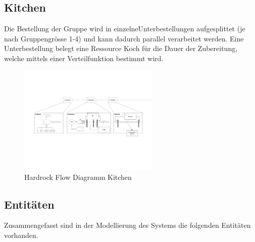 \documentclass[ngerman,a4paper,12pt]{scrreprt}
\begin{document}
\begin{landscape}
		\subsection{Kitchen}
		Die Bestellung der Gruppe wird in einzelneUnterbestellungen aufgesplittet (je nach Gruppengrösse 1-4) und kann dadurch parallel verarbeitet werden. Eine Unterbestellung belegt eine Ressource Koch für die Dauer der Zubereitung, welche mittels einer Verteilfunktion bestimmt wird.
		
		\begin{figure}[H]
			\begin{center}
					\includegraphics[page=3,trim=2cm 12cm 12cm 2cm, clip=true,width=0.6\textwidth]{../model/Modell_v2.pdf}
					\caption[Hardrock Flow Diagramm Kitchen]{Hardrock Flow Diagramm Kitchen}
					\label{flowDiagrammKitchen}
			\end{center}
		\end{figure}
		
		
\end{landscape}

		\subsection{Entitäten}
		Zusammengefasst sind in der Modellierung des Systems die folgenden Entitäten vorhanden.
		
\end{document}
